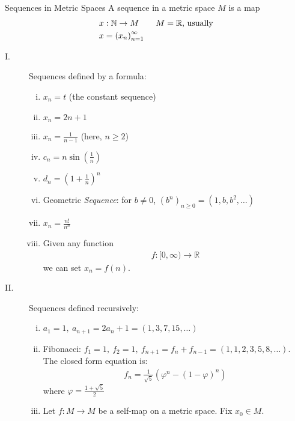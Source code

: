 \documentclass[10pt]{extarticle}
\newcommand{\N}{\mathbb{N}}
\newcommand{\R}{\mathbb{R}}
\begin{document}
  \begin{problem}{Sequences in Metric Spaces}
    A sequence in a metric space $M$ is a map
    \begin{align*}
      x&: \N \rightarrow M \tag*{$M = \R$, usually}\\
      x &= \left(x_n\right)_{n=1}^{\infty}
    \end{align*}
    \begin{description}
      \item[I.] Sequences defined by a formula:
        \begin{enumerate}[(i)]
          \item $x_n = t$ (the constant sequence)
          \item $x_n = 2n + 1$
          \item $x_n = \frac{1}{n-1}$ (here, $n \geq 2$)
          \item $c_n = n\sin\left(\frac{1}{n}\right)$
          \item $d_n = \left(1 + \frac{1}{n}\right)^n$
          \item Geometric \textit{Sequence}: for $b\neq 0$, $(b^n)_{n\geq 0} = (1,b,b^2,\dots)$
          \item $x_n = \frac{n!}{n^n}$
          \item Given any function
            \begin{align*}
              f:[0,\infty)\rightarrow\R
            \end{align*}
            we can set $x_n = f(n)$.
        \end{enumerate}
      \item[II.] Sequences defined recursively:
        \begin{enumerate}[(i)]
          \item $a_1 = 1,~a_{n+1}=2a_n + 1 = (1,3,7,15,\dots)$
          \item Fibonacci: $f_1 = 1,~f_2 = 1,~f_{n+1} = f_{n} + f_{n-1} = (1,1,2,3,5,8,\dots)$. The closed form equation is:
            \begin{align*}
              f_n = \frac{1}{\sqrt{5}}\left(\varphi^n - (1-\varphi)^n\right)
            \end{align*}
            where $\varphi = \frac{1 + \sqrt{5}}{2}$
          \item Let $f: M\rightarrow M$ be a self-map on a metric space. Fix $x_0\in M$.\\


\end{enumerate}
\end{description}
\end{problem}
\end{document}
